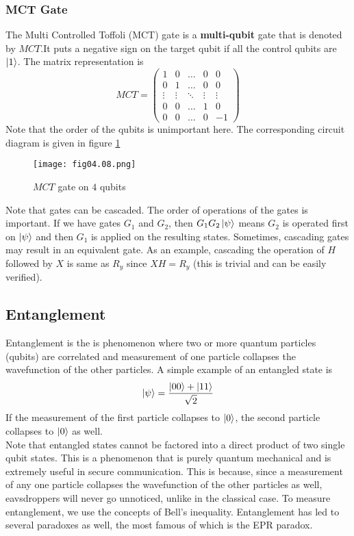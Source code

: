 \subsubsection*{MCT Gate}
The Multi Controlled Toffoli (MCT) gate is a \textbf{multi-qubit} gate that is denoted by $MCT$.It puts a negative sign on the target qubit if all the control qubits are $\left\vert 1\right\rangle$.
The matrix representation is
\begin{equation*}
MCT=
\begin{pmatrix}
1&0&\dots&0&0\\
0&1&\dots&0&0\\
\vdots&\vdots&\ddots&\vdots&\vdots\\
0&0&\dots&1&0\\
0&0&\dots&0&-1
\end{pmatrix}
\end{equation*}
Note that the order of the qubits is unimportant here. The corresponding circuit diagram is given in figure \ref{Fig:4.8}
\begin{figure}[!htb]
   \begin{minipage}{\textwidth}
     \centering
     \texttt{[image: fig04.08.png]}
     \caption{$MCT$ gate on $4$ qubits}
     \label{Fig:4.8}
   \end{minipage}
\end{figure}


Note that gates can be cascaded. The order of operations of the gates is important. If we have gates $G_1$ and $G_2$, then $G_1G_2\left\vert \psi\right\rangle$ means $G_2$ is operated first on $\left\vert \psi\right\rangle$ and then $G_1$ is applied on the resulting states. Sometimes, cascading gates may result in an equivalent gate. As an example, cascading the operation of $H$ followed by $X$ is same as $R_y$ since $XH=R_y$ (this is trivial and can be easily verified). 

\subsection{Entanglement}
Entanglement is the is phenomenon where two or more quantum particles (qubits) are correlated and measurement of one particle collapses the wavefunction of the other particles. A simple example of an entangled state is
\begin{equation*}
\left\vert \psi\right\rangle=\frac{\displaystyle \left\vert 00\right\rangle+\left\vert 11\right\rangle}{\displaystyle \sqrt{2}}
\end{equation*}
If the measurement of the first particle collapses to $\left\vert 0\right\rangle$, the second particle collapses to $\left\vert 0\right\rangle$ as well.\\
Note that entangled states cannot be factored into a direct product of two single qubit states. This is a phenomenon that is purely quantum mechanical and is extremely useful in secure communication. This is because, since a measurement of any one particle collapses the wavefunction of the other particles as well, eavsdroppers will never go unnoticed, unlike in the classical case. To measure entanglement, we use the concepts of Bell's inequality. Entanglement has led to several paradoxes as well, the most famous of which is the EPR paradox.%